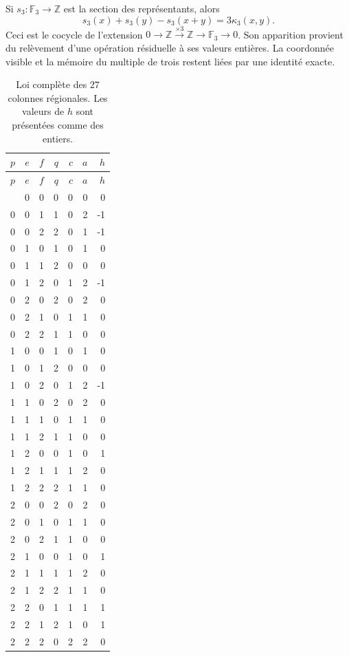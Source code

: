 Si \(s_3:\mathbb F_3\to\mathbb Z\) est la section des
représentants, alors
\[
s_3(x)+s_3(y)-s_3(x+y)=3\kappa_3(x,y).
\]
Ceci est le cocycle de l'extension
\(0\to\mathbb Z\xrightarrow{\times3}\mathbb Z\to\mathbb F_3\to0\).
Son apparition provient du relèvement d'une opération résiduelle
à ses valeurs entières. La coordonnée visible et la mémoire du
multiple de trois restent liées par une identité exacte.

\begin{longtable}{ccc|rrrr}
\caption{Loi complète des \(27\) colonnes régionales.
Les valeurs de \(h\) sont présentées comme des entiers.}
\label{carry27:tabla}\\
\toprule
\(p\)&\(e\)&\(f\)&\(q\)&\(c\)&\(a\)&\(h\)\\
\midrule\endfirsthead
\toprule
\(p\)&\(e\)&\(f\)&\(q\)&\(c\)&\(a\)&\(h\)\\
\midrule\endhead
\bottomrule\endfoot
0&0&0&0&0&0&0\\
0&0&1&1&0&2&-1\\
0&0&2&2&0&1&-1\\
0&1&0&1&0&1&0\\
0&1&1&2&0&0&0\\
0&1&2&0&1&2&-1\\
0&2&0&2&0&2&0\\
0&2&1&0&1&1&0\\
0&2&2&1&1&0&0\\
1&0&0&1&0&1&0\\
1&0&1&2&0&0&0\\
1&0&2&0&1&2&-1\\
1&1&0&2&0&2&0\\
1&1&1&0&1&1&0\\
1&1&2&1&1&0&0\\
1&2&0&0&1&0&1\\
1&2&1&1&1&2&0\\
1&2&2&2&1&1&0\\
2&0&0&2&0&2&0\\
2&0&1&0&1&1&0\\
2&0&2&1&1&0&0\\
2&1&0&0&1&0&1\\
2&1&1&1&1&2&0\\
2&1&2&2&1&1&0\\
2&2&0&1&1&1&1\\
2&2&1&2&1&0&1\\
2&2&2&0&2&2&0\\
\end{longtable}

